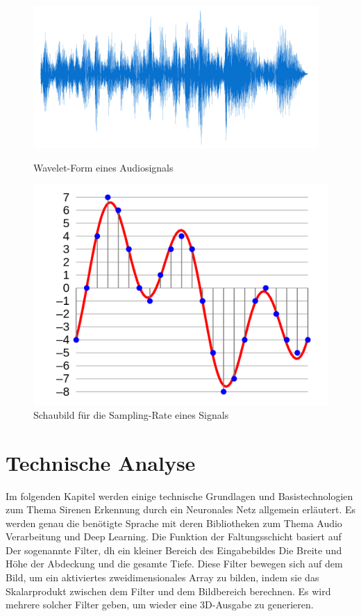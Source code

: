 \documentclass[a4paper,11pt]{article}
\theoremstyle{mytheor}
\begin{document}
\begin{figure}[htbp]
\begin{minipage}[c]{0.5\textwidth}

\includegraphics[width=\textwidth]{Wavelet.png}
	\caption {Wavelet-Form eines Audiosignals }
\end{minipage}
\hfill
\begin{minipage}[c]{0.5\textwidth}
\includegraphics[width=\textwidth]{4-bit-linear-PCM.png}
	\caption [Schaubild für die Sampling-Rate eines Signals] {Schaubild für die Sampling-Rate eines Signals \footnotemark}

\end{minipage}	
\end{figure}	
\section{Technische Analyse}
Im folgenden Kapitel werden einige technische Grundlagen und Basistechnologien zum Thema Sirenen Erkennung durch ein Neuronales Netz allgemein erläutert. Es werden genau die benötigte Sprache mit deren Bibliotheken zum Thema Audio Verarbeitung und Deep Learning. Die Funktion der Faltungsschicht basiert auf Der sogenannte Filter, dh ein kleiner Bereich des Eingabebildes Die Breite und Höhe der Abdeckung und die gesamte Tiefe. Diese Filter bewegen sich auf dem Bild, um ein aktiviertes zweidimensionales Array zu bilden, indem sie das Skalarprodukt zwischen dem Filter und dem Bildbereich berechnen. Es wird mehrere solcher Filter geben, um wieder eine 3D-Ausgabe zu generieren.
\end{document}

